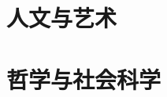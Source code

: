 \documentclass[a4paper,12pt]{book}
\begin{document}










\part{人文与艺术}





\part{哲学与社会科学}



\end{document}
